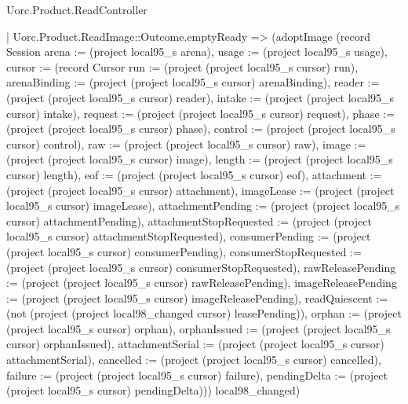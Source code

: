 \begin{lexlean}{Uorc.Product.ReadController}
\begin{semanticmodule}
{      | Uorc.Product.ReadImage::Outcome.emptyReady => (adoptImage (record Session {arena := (project local95_s arena), usage := (project local95_s usage), cursor := (record Cursor {run := (project (project local95_s cursor) run), arenaBinding := (project (project local95_s cursor) arenaBinding), reader := (project (project local95_s cursor) reader), intake := (project (project local95_s cursor) intake), request := (project (project local95_s cursor) request), phase := (project (project local95_s cursor) phase), control := (project (project local95_s cursor) control), raw := (project (project local95_s cursor) raw), image := (project (project local95_s cursor) image), length := (project (project local95_s cursor) length), eof := (project (project local95_s cursor) eof), attachment := (project (project local95_s cursor) attachment), imageLease := (project (project local95_s cursor) imageLease), attachmentPending := (project (project local95_s cursor) attachmentPending), attachmentStopRequested := (project (project local95_s cursor) attachmentStopRequested), consumerPending := (project (project local95_s cursor) consumerPending), consumerStopRequested := (project (project local95_s cursor) consumerStopRequested), rawReleasePending := (project (project local95_s cursor) rawReleasePending), imageReleasePending := (project (project local95_s cursor) imageReleasePending), readQuiescent := (not (project (project local98_changed cursor) leasePending)), orphan := (project (project local95_s cursor) orphan), orphanIssued := (project (project local95_s cursor) orphanIssued), attachmentSerial := (project (project local95_s cursor) attachmentSerial), cancelled := (project (project local95_s cursor) cancelled), failure := (project (project local95_s cursor) failure), pendingDelta := (project (project local95_s cursor) pendingDelta)})}) local98_changed)
}
\end{semanticmodule}
\end{lexlean}
